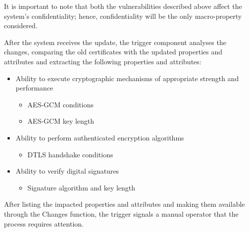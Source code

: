 It is important to note that both the vulnerabilities described above affect the system's confidentiality; hence, confidentiality will be the only macro-property considered.

After the system receives the update, the trigger component analyses the changes, comparing the old certificates with the updated properties and attributes and extracting the following properties and attributes:
\begin{itemize}
    \item Ability to execute cryptographic mechanisms of appropriate strength and performance
    \begin{itemize}
        \item AES-GCM conditions
        \item AES-GCM key length
    \end{itemize}
    \item Ability to perform authenticated encryption algorithms
    \begin{itemize}
        \item DTLS handshake conditions
    \end{itemize}
    \item Ability to verify digital signatures
    \begin{itemize}
        \item Signature algorithm and key length
    \end{itemize}

\end{itemize}

After listing the impacted properties and attributes and making them available through the Changes function, the trigger signals a manual operator that the process requires attention.

